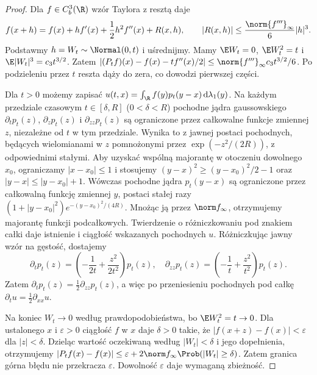 \begin{proof}
Dla $f\in C_b^3(\R)$ wzór Taylora z resztą daje
\[
f(x+h)=f(x)+hf'(x)+\frac12h^2f''(x)+R(x,h),\qquad
|R(x,h)|\le\frac{\norm{f'''}_\infty}{6}|h|^3.
\]
Podstawmy $h=W_t\sim\Normal(0,t)$ i uśrednijmy.
Mamy $\E W_t=0$, $\E W_t^2=t$ i
$\E|W_t|^3=c_3t^{3/2}$. Zatem
$|(P_tf)(x)-f(x)-tf''(x)/2|
\le \norm{f'''}_\infty c_3t^{3/2}/6$.
Po podzieleniu przez $t$ reszta dąży do zera,
co dowodzi pierwszej części.

Dla $t>0$ możemy zapisać
$u(t,x)=\int_\R f(y)p_t(y-x)\,\mathrm d\lambda_1(y)$.
Na każdym przedziale czasowym $t\in[\delta,R]$
($0<\delta<R$) pochodne jądra gaussowskiego
$\partial_t p_t(z)$, $\partial_zp_t(z)$ i
$\partial_{zz}p_t(z)$ są ograniczone przez całkowalne
funkcje zmiennej $z$, niezależne od $t$ w tym przedziale.
Wynika to z jawnej postaci pochodnych, będących
wielomianami w $z$ pomnożonymi przez
$\exp(-z^2/(2R))$, z odpowiednimi stałymi.
Aby uzyskać wspólną majorantę w otoczeniu dowolnego
$x_0$, ograniczamy $|x-x_0|\le1$ i stosujemy
$(y-x)^2\ge (y-x_0)^2/2-1$ oraz
$|y-x|\le |y-x_0|+1$. Wówczas pochodne jądra
$p_t(y-x)$ są ograniczone przez całkowalną funkcję
zmiennej $y$, postaci stałej razy
$(1+|y-x_0|^2)e^{-(y-x_0)^2/(4R)}$.
Mnożąc ją przez $\norm f_\infty$, otrzymujemy
majorantę funkcji podcałkowych. Twierdzenie o
różniczkowaniu pod znakiem całki daje istnienie
i ciągłość wskazanych pochodnych $u$.
Różniczkując jawny wzór na gęstość, dostajemy
\[
\partial_t p_t(z)=\left(-\frac1{2t}+\frac{z^2}{2t^2}\right)p_t(z),
\quad
\partial_{zz}p_t(z)=\left(-\frac1t+\frac{z^2}{t^2}\right)p_t(z).
\]
Zatem $\partial_t p_t(z)=\frac12\partial_{zz}p_t(z)$,
a więc po przeniesieniu pochodnych pod całkę
$\partial_tu=\frac12\partial_{xx}u$.

Na koniec $W_t\to0$ według prawdopodobieństwa,
bo $\E W_t^2=t\to0$. Dla ustalonego $x$ i
$\varepsilon>0$ ciągłość $f$ w $x$ daje $\delta>0$
takie, że $|f(x+z)-f(x)|<\varepsilon$ dla $|z|<\delta$.
Dzieląc wartość oczekiwaną według $|W_t|<\delta$
i jego dopełnienia, otrzymujemy
$|P_tf(x)-f(x)|\le\varepsilon
+2\norm f_\infty\Prob(|W_t|\ge\delta)$.
Zatem granica górna błędu nie przekracza $\varepsilon$.
Dowolność $\varepsilon$ daje wymaganą zbieżność.
\end{proof}

